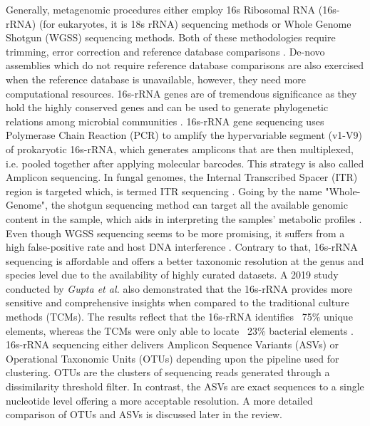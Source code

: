 Generally, metagenomic procedures either employ 16s Ribosomal RNA (16s-rRNA) (for eukaryotes, it is 18s rRNA) sequencing methods or Whole Genome Shotgun (WGSS) sequencing methods. Both of these methodologies require trimming, error correction and reference database comparisons \cite{ref3}. De-novo assemblies which do not require reference database comparisons are also exercised when the reference database is unavailable, however, they need more computational resources. 16s-rRNA genes are of tremendous significance as they hold the highly conserved genes and can be used to generate phylogenetic relations among microbial communities \cite{ref3}. 16s-rRNA gene sequencing uses Polymerase Chain Reaction (PCR) to amplify the hypervariable segment (v1-V9) of prokaryotic 16s-rRNA, which generates amplicons that are then multiplexed, i.e. pooled together after applying molecular barcodes. This strategy is also called Amplicon sequencing. In fungal genomes, the Internal Transcribed Spacer (ITR) region is targeted which, is termed ITR sequencing \cite{ref3}. Going by the name "Whole-Genome", the shotgun sequencing method can target all the available genomic content in the sample, which aids in interpreting the samples' metabolic profiles \cite{ref4}. Even though WGSS sequencing seems to be more promising, it suffers from a high false-positive rate and host DNA interference \cite{ref4}. Contrary to that, 16s-rRNA sequencing is affordable and offers a better taxonomic resolution at the genus and species level due to the availability of highly curated datasets. A 2019 study conducted by \emph{Gupta et al.} also demonstrated that the 16s-rRNA provides more sensitive and comprehensive insights when compared to the traditional culture methods (TCMs). The results reflect that the 16s-rRNA identifies ~75\% unique elements, whereas the TCMs were only able to locate ~23\% bacterial elements \cite{ref5}. 16s-rRNA sequencing either delivers Amplicon Sequence Variants (ASVs) or Operational Taxonomic Units (OTUs) depending upon the pipeline used for clustering. OTUs are the clusters of sequencing reads generated through a dissimilarity threshold filter. In contrast, the ASVs are exact sequences to a single nucleotide level offering a more acceptable resolution. A more detailed comparison of OTUs and ASVs is discussed later in the review.

